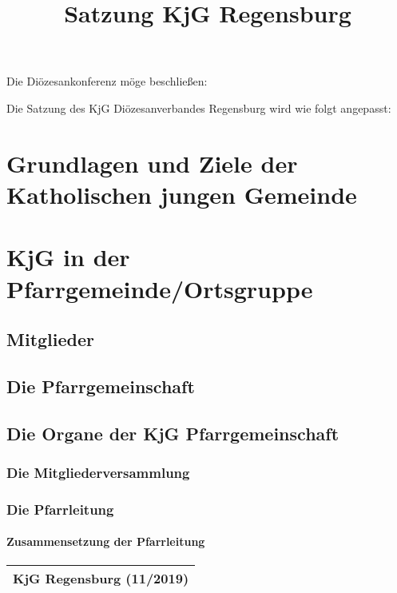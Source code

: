 \documentclass[12pt]{report}
\title{Satzung KjG Regensburg}
\author{}
\newcounter{tablecounter}
\newcommand\showcounter{\addtocounter{tablecounter}{1}\thetablecounter}
\begin{document}
  \setcounter{page}{1}


\begin{flushleft}
Die Diözesankonferenz möge beschließen:

Die Satzung des KjG Diözesanverbandes Regensburg wird wie folgt angepasst:
\chapter{Grundlagen und Ziele der Katholischen jungen Gemeinde}

\chapter{KjG in der Pfarrgemeinde/Ortsgruppe}
\section{Mitglieder}

\section{Die Pfarrgemeinschaft}

\section{Die Organe der KjG Pfarrgemeinschaft}
\subsection{Die Mitgliederversammlung}
\subsection{Die Pfarrleitung}
\subsubsection{Zusammensetzung der Pfarrleitung}
\begin{table}[H]
 \begin{tabular}{|l|}
  \hline
  \rowcolor[HTML]{FFCC67} 
  \rule[-1ex]{0pt}{4ex} \textbf{KjG Regensburg (11/2019)}     \hspace{0.6\textwidth} \showcounter        \\ \hline
 \end{tabular}
\end{table}



\end{flushleft}
\end{document}
